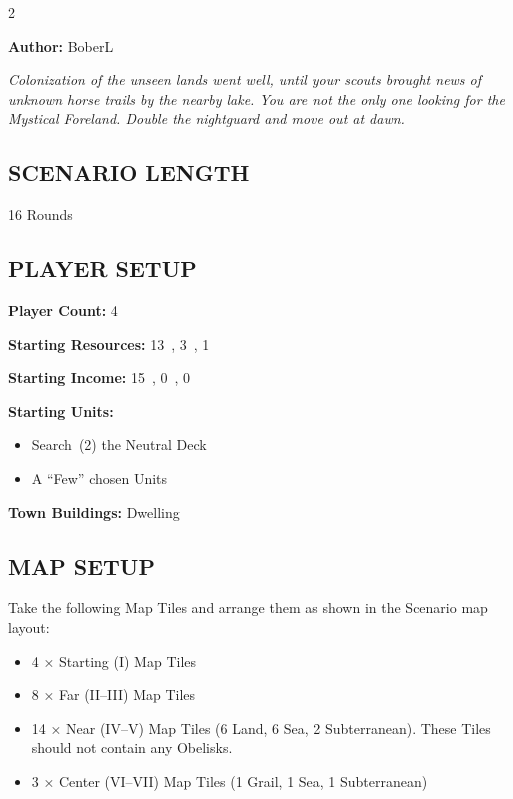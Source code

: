 
\begin{multicols}{2}

\textbf{Author:} BoberL

\textit{Colonization of the unseen lands went well, until your scouts brought news of unknown horse trails by the nearby lake.
You are not the only one looking for the Mystical Foreland.
Double the nightguard and move out at dawn.}  %

\subsection*{\MakeUppercase{Scenario Length}}
16 Rounds

\subsection*{\MakeUppercase{Player Setup}}
\textbf{Player Count:} 4

\textbf{Starting Resources:} 13~, 3~, 1~

\textbf{Starting Income:} 15~, 0~, 0~

\textbf{Starting Units:}

\begin{itemize}
  \item Search~(2) the  Neutral Deck
  \item A ``Few'' chosen  Units
\end{itemize}

\textbf{Town Buildings:}  Dwelling

\subsection*{\MakeUppercase{Map Setup}}
Take the following Map Tiles and arrange them as shown in the Scenario map layout:

\begin{itemize}
  \item 4 × Starting (I) Map Tiles
  \item 8 × Far (II--III) Map Tiles
  \item 14 × Near (IV--V) Map Tiles (6 Land, 6 Sea, 2 Subterranean). These Tiles should not contain any Obelisks.
  \item 3 × Center (VI--VII) Map Tiles (1 Grail, 1 Sea, 1 Subterranean)
\end{itemize}


\end{multicols}
